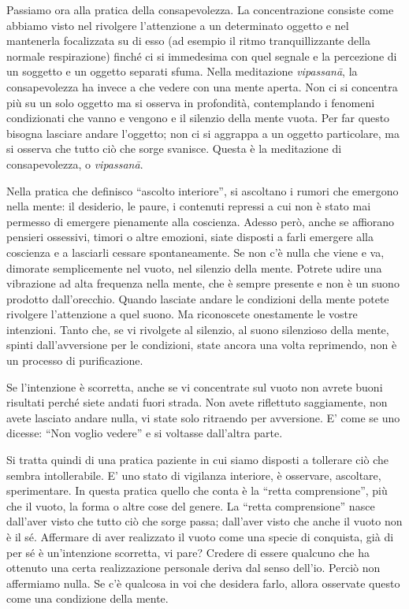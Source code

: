 
Passiamo ora alla pratica della consapevolezza. La concentrazione
consiste come abbiamo visto nel rivolgere l'attenzione a un determinato
oggetto e nel mantenerla focalizzata su di esso (ad esempio il ritmo
tranquillizzante della normale respirazione) finché ci si immedesima con
quel segnale e la percezione di un soggetto e un oggetto separati sfuma.
Nella meditazione \textit{vipassanā}, la consapevolezza ha invece a che vedere
con una mente aperta. Non ci si concentra più su un solo oggetto ma si
osserva in profondità, contemplando i fenomeni condizionati che vanno e
vengono e il silenzio della mente vuota. Per far questo bisogna lasciare
andare l'oggetto; non ci si aggrappa a un oggetto particolare, ma si
osserva che tutto ciò che sorge svanisce. Questa è la meditazione di
consapevolezza, o \textit{vipassanā}.

Nella pratica che definisco ``ascolto interiore'', si ascoltano i rumori
che emergono nella mente: il desiderio, le paure, i contenuti repressi a
cui non è stato mai permesso di emergere pienamente alla coscienza.
Adesso però, anche se affiorano pensieri ossessivi, timori o altre
emozioni, siate disposti a farli emergere alla coscienza e a lasciarli
cessare spontaneamente. Se non c'è nulla che viene e va, dimorate
semplicemente nel vuoto, nel silenzio della mente. Potrete udire una
vibrazione ad alta frequenza nella mente, che è sempre presente e non è
un suono prodotto dall'orecchio. Quando lasciate andare le condizioni
della mente potete rivolgere l'attenzione a quel suono. Ma riconoscete
onestamente le vostre intenzioni. Tanto che, se vi rivolgete al
silenzio, al suono silenzioso della mente, spinti dall'avversione per le
condizioni, state ancora una volta reprimendo, non è un processo di
purificazione.

Se l'intenzione è scorretta, anche se vi concentrate sul vuoto non
avrete buoni risultati perché siete andati fuori strada. Non avete
riflettuto saggiamente, non avete lasciato andare nulla, vi state solo
ritraendo per avversione. E' come se uno dicesse: ``Non voglio vedere'' e
si voltasse dall'altra parte.

Si tratta quindi di una pratica paziente in cui siamo disposti a
tollerare ciò che sembra intollerabile. E' uno stato di vigilanza
interiore, è osservare, ascoltare, sperimentare. In questa pratica
quello che conta è la ``retta comprensione”, più che il vuoto, la forma o
altre cose del genere. La ``retta comprensione” nasce dall'aver visto che
tutto ciò che sorge passa; dall'aver visto che anche il vuoto non è il
sé. Affermare di aver realizzato il vuoto come una specie di conquista,
già di per sé è un'intenzione scorretta, vi pare? Credere di essere
qualcuno che ha ottenuto una certa realizzazione personale deriva dal
senso dell'io. Perciò non affermiamo nulla. Se c'è qualcosa in voi che
desidera farlo, allora osservate questo come una condizione della mente.

